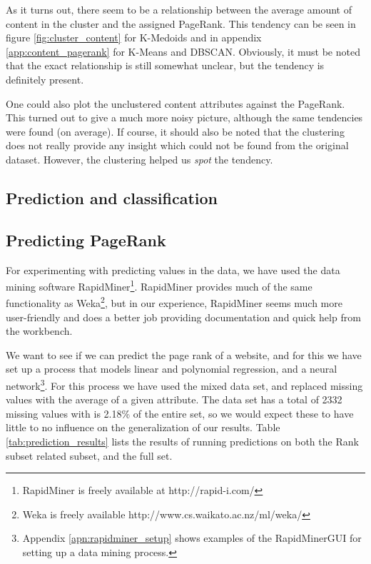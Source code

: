 As it turns out, there seem to be a relationship between the average amount of content in the cluster and the assigned PageRank. This tendency can be seen in figure \ref{fig:cluster_content} for K-Medoids and in appendix \ref{app:content_pagerank} for K-Means and DBSCAN. Obviously, it must be noted that the exact relationship is still somewhat unclear, but the tendency is definitely present.


One could also plot the unclustered content attributes against the PageRank. This turned out to give a much more noisy picture, although the same tendencies were found (on average). If course, it should also be noted that the clustering does not really provide any insight which could not be found from the original dataset. However, the clustering helped us \textit{spot} the tendency.

\subsection{Prediction and classification}
\label{subsec:predictclassify}

\subsection{Predicting PageRank}
\label{subsec:predection}
For experimenting with predicting values in the data, we have used the data mining software RapidMiner\footnote{RapidMiner is freely available at http://rapid-i.com/}. RapidMiner provides much of the same functionality as Weka\footnote{Weka is freely available http://www.cs.waikato.ac.nz/ml/weka/}, but in our experience, RapidMiner seems much more user-friendly and does a better job providing documentation and quick help from the workbench.

We want to see if we can predict the page rank of a website, and for this we have set up a process that models linear and polynomial regression, and a neural network\footnote{Appendix \ref{apn:rapidminer_setup} shows examples of the RapidMinerGUI for setting up a data mining process.}. For this process we have used the mixed data set, and replaced missing values with the average of a given attribute. The data set has a total of 2332 missing values with is 2.18\% of the entire set, so we would expect these to have little to no influence on the generalization of our results. Table \ref{tab:prediction_results} lists the results of running predictions on both the Rank subset related subset, and the full set.

